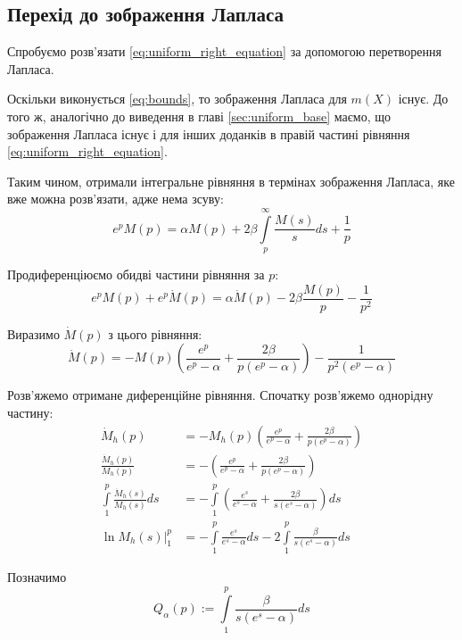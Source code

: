 \subsection{Перехід до зображення Лапласа}
\label{sec:uniform_right_integral_laplace}

Спробуємо розв'язати \eqref{eq:uniform_right_equation} за допомогою перетворення Лапласа.

Оскільки виконується \eqref{eq:bounds}, то зображення Лапласа для $m(X)$ існує. До того ж, аналогічно до виведення в главі \ref{sec:uniform_base} маємо, що зображення Лапласа існує і для інших доданків в правій частині рівняння \eqref{eq:uniform_right_equation}.

Таким чином, отримали інтегральне рівняння в термінах зображення Лапласа, яке вже можна розв'язати, адже нема зсуву:
\begin{equation}
	\label{eq:uniform_right_laplace_integral}
	e^p M(p) = \alpha M(p) + 2\beta \int\limits_p^\infty \frac{M(s)}{s} ds + \frac{1}{p}
\end{equation}

Продиференціюємо обидві частини рівняння за $p$:
\begin{equation}
	e^p M(p) + e^p \dot M(p) =\alpha \dot M(p) - 2 \beta \frac{M(p)}{p}  - \frac1{p^2}
\end{equation}

Виразимо $\dot M(p)$ з цього рівняння:
\begin{equation}
	\label{eq:uniform_right_laplace_diff}
	\dot M(p) = - M(p)\left(\frac{e^p}{e^p - \alpha} + \frac{2\beta}{p(e^p - \alpha)}\right) - \frac{1}{p^2(e^p - \alpha)}
\end{equation}

Розв'яжемо отримане диференційне рівняння. Спочатку розв'яжемо однорідну частину:
\begin{align*}
	\dot M_h (p) &= - M_h (p)\left(\frac{e^p}{e^p - \alpha} + \frac{2\beta}{p(e^p - \alpha)}\right) \\
	\frac{\dot M_h (p)}{M_h (p)} &= -\left(\frac{e^p}{e^p - \alpha} + \frac{2\beta}{p(e^p - \alpha)}\right) \\
	\int\limits_1^p \frac{\dot M_h (s)}{M_h (s)} ds &= -\int\limits_1^p \left(\frac{e^s}{e^s - \alpha} + \frac{2\beta}{s(e^s - \alpha)}\right) ds \\
	\left. \ln{M_h (s)}\right|_1^p &= - \int\limits_1^p \frac{e^s}{e^s - \alpha} ds  - 2 \int\limits_1^p \frac{\beta}{s(e^s - \alpha)} ds
\end{align*}

Позначимо
\begin{equation}
	\label{eq:almost_li_alpha}
	Q_\alpha(p) := \int\limits_1^p \frac{\beta}{s(e^s - \alpha)} ds
\end{equation}

